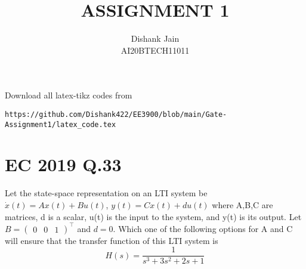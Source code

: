 \documentclass[journal,12pt,twocolumn]{IEEEtran}
\begin{document}
     \def\centbox#1{\makebox[0in]{#1}}
     \def\topbox#1{\raisebox{-\baselineskip}[0in][0in]{#1}}
     \def\midbox#1{\raisebox{-0.5\baselineskip}[0in][0in]{#1}}
\vspace{3cm}
\title{ASSIGNMENT 1}
\author{Dishank Jain \\ AI20BTECH11011}
\maketitle
\newpage
\bigskip
\renewcommand{\thefigure}{\theenumi}
\renewcommand{\thetable}{\theenumi}
Download all latex-tikz codes from 
%
\begin{lstlisting}
https://github.com/Dishank422/EE3900/blob/main/Gate-Assignment1/latex_code.tex
\end{lstlisting}
%
\section{EC 2019 Q.33}
Let the state-space representation on an LTI system be $\dot{x}(t) = Ax(t)+Bu(t)$, $y(t)=Cx(t)+du(t)$ where A,B,C are matrices,  d is a scalar, u(t) is the input to the system, and y(t) is its output. Let $B = \begin{pmatrix} 0 & 0 &  1\end{pmatrix}^\top$ and $d = 0$. Which one of the following options for A and C will ensure that the transfer function of this LTI system is 
\begin{equation}
    H(s) = \dfrac{1}{s^3+3s^2+2s+1}
\end{equation}
\end{document}
